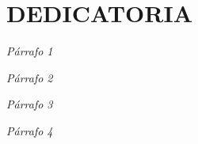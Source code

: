 \chapter*{DEDICATORIA}
		\begin{center}
			\textit{Párrafo 1}	
		\end{center}
	
		\begin{center}
			\textit{Párrafo 2}
		\end{center}
	
		\begin{center}		
			\textit{Párrafo 3}
		\end{center}
	
		\begin{center}
			\textit{Párrafo 4}
		\end{center}